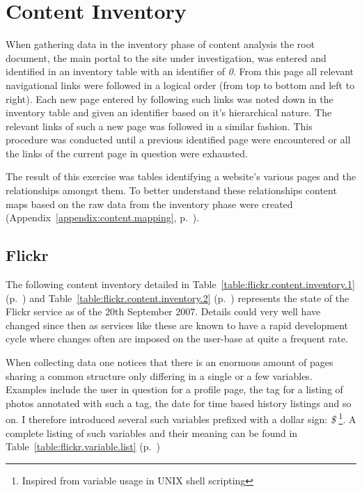 \chapter{Content Inventory}

When gathering data in the inventory phase of content analysis the root
document, the main portal to the site under investigation, was entered and
identified in an inventory table with an identifier of \emph{0}. From this page
all relevant navigational links were followed in a logical order (from top
to bottom and left to right). Each new page entered by following such links
was noted down in the inventory table and given an identifier based on it's
hierarchical nature. The relevant links of such a new page
was followed in a similar fashion. This procedure was conducted until a
previous identified page were encountered or all the links of the current page
in question were exhausted.

The result of this exercise was tables identifying a website's various pages
and the relationships amongst them. To better understand these relationships
content maps based on the raw data from the inventory phase were created
(Appendix~\ref{appendix:content.mapping},
p.~\pageref{appendix:content.mapping}).

\label{appendix:content.inventory}

\section{Flickr}

The following content inventory detailed in
Table~\ref{table:flickr.content.inventory.1}
(p.~\pageref{table:flickr.content.inventory.1}) and
Table~\ref{table:flickr.content.inventory.2}
(p.~\pageref{table:flickr.content.inventory.2})
represents the state of the Flickr service as of the 20th September 2007.
Details could very well have changed since then as
services like these are known to have a rapid development cycle
where changes often are imposed on the user-base at quite
a frequent rate.

When collecting data one notices that there is an enormous amount of pages
sharing a common structure only differing in a single or a few variables.
Examples include
the user in question for a profile page, the tag for a listing of photos
annotated with such a tag, the date for time based history listings and so on.
I therefore introduced several such variables prefixed with a dollar sign:
\emph{\$}
\footnote{Inspired from variable usage in UNIX shell scripting}. A complete
listing of such variables and their meaning can be found in
Table~\ref{table:flickr.variable.list}
(p.~\pageref{table:flickr.variable.list})

